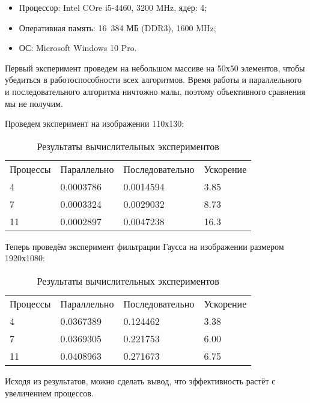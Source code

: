\documentclass{report}
\begin{document}
\begin{itemize}
\item Процессор: Intel COre i5-4460, 3200 MHz, ядер: 4;
\item Оперативная память: 16 384 МБ (DDR3), 1600 MHz;
\item ОС: Microsoft Windows 10 Pro.
\end{itemize}

\par Первый эксперимент проведем на небольшом массиве на 50х50 элементов, чтобы убедиться в работоспособности всех алгоритмов. Время работы и параллельного и последовательного алгоритма ничтожно малы, поэтому объективного сравнения мы не получим.
\par Проведем эксперимент на изображении 110х130:

\begin{table}[!h]
\caption{Результаты вычислительных экспериментов}
\centering
\begin{tabular}{p{3cm} p{4cm} p{4cm} p{4cm}}
Процессы & Параллельно & Последовательно & Ускорение  \\
4        & 0.0003786         & 0.0014594     & 3.85       \\
7        & 0.0003324        & 0.0029032     & 8.73       \\
11        & 0.0002897         & 0.0047238     & 16.3
\end{tabular}
\end{table}

\par Теперь проведём эксперимент фильтрации Гаусса на изображении размером 1920х1080:

\begin{table}[!h]
\caption{Результаты вычислительных экспериментов}
\centering
\begin{tabular}{p{3cm} p{4cm} p{4cm} p{4cm}}
Процессы & Параллельно & Последовательно & Ускорение  \\
4        & 0.0367389         & 0.124462     & 3.38       \\
7        &   0.0369305        &  0.221753     & 6.00       \\
11        & 0.0408963         &  0.271673     & 6.75
\end{tabular}
\end{table}

\par Исходя из результатов, можно сделать вывод, что эффективность растёт с увеличением процессов. 
\newpage

\end{document}

